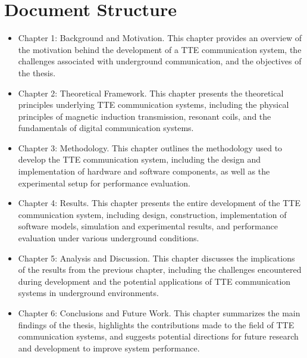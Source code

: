 \section{Document Structure}
\begin{itemize}
    \item Chapter 1: Background and Motivation. This chapter provides an overview of the motivation behind the development of a TTE communication system, the challenges associated with underground communication, and the objectives of the thesis.
    \item Chapter 2: Theoretical Framework. This chapter presents the theoretical principles underlying TTE communication systems, including the physical principles of magnetic induction transmission, resonant coils, and the fundamentals of digital communication systems.
    \item Chapter 3: Methodology. This chapter outlines the methodology used to develop the TTE communication system, including the design and implementation of hardware and software components, as well as the experimental setup for performance evaluation.
    \item Chapter 4: Results. This chapter presents the entire development of the TTE communication system, including design, construction, implementation of software models, simulation and experimental results, and performance evaluation under various underground conditions.
    \item Chapter 5: Analysis and Discussion. This chapter discusses the implications of the results from the previous chapter, including the challenges encountered during development and the potential applications of TTE communication systems in underground environments.
    \item Chapter 6: Conclusions and Future Work. This chapter summarizes the main findings of the thesis, highlights the contributions made to the field of TTE communication systems, and suggests potential directions for future research and development to improve system performance.
\end{itemize}

